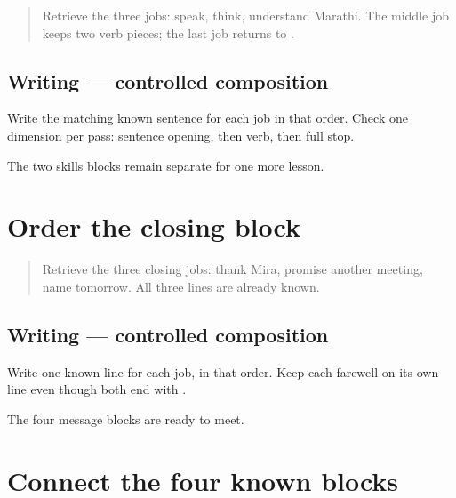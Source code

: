 \label{lesson:MR-A1M15-skills-block-two}



\begin{quote}
Retrieve the three jobs: speak, think, understand Marathi. The middle job keeps two verb pieces; the last job returns to \textbf{}.
\end{quote}

\subsection*{Writing — controlled composition}
Write the matching known sentence for each job in that order. Check one dimension per pass: sentence opening, then verb, then full stop.

\begin{tcolorbox}[breakable,colback=teal!4,colframe=teal!35!black,title={Before you move on}]
The two skills blocks remain separate for one more lesson.
\end{tcolorbox}
\section[closing block]{Order the closing block}

\label{lesson:MR-A1M16-closing-block}



\begin{quote}
Retrieve the three closing jobs: thank Mira, promise another meeting, name tomorrow. All three lines are already known.
\end{quote}

\subsection*{Writing — controlled composition}
Write one known line for each job, in that order. Keep each farewell on its own line even though both end with \textbf{}.

\begin{tcolorbox}[breakable,colback=teal!4,colframe=teal!35!black,title={Before you move on}]
The four message blocks are ready to meet.
\end{tcolorbox}
\section[guided 32-word message]{Connect the four known blocks}

\label{lesson:MR-A1M17-guided-message}




